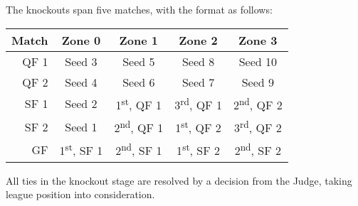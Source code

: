 The knockouts span five matches, with the format as follows:

\begin{center}
  \begin{tabular}{r|cccc}
  \toprule
  \textbf{Match} & \textbf{Zone 0} & \textbf{Zone 1} & \textbf{Zone 2} &
                   \textbf{Zone 3} \\
  \midrule
  QF 1 & Seed 3 & Seed 5 & Seed 8 & Seed 10 \\
  QF 2 & Seed 4 & Seed 6 & Seed 7 & Seed 9 \\
  SF 1 & Seed 2
       & 1\textsuperscript{st}, QF 1
       & 3\textsuperscript{rd}, QF 1
       & 2\textsuperscript{nd}, QF 2 \\
  SF 2 & Seed 1
       & 2\textsuperscript{nd}, QF 1
       & 1\textsuperscript{st}, QF 2
       & 3\textsuperscript{rd}, QF 2 \\
  GF & 1\textsuperscript{st}, SF 1
     & 2\textsuperscript{nd}, SF 1
     & 1\textsuperscript{st}, SF 2
     & 2\textsuperscript{nd}, SF 2 \\
  \bottomrule
  \end{tabular}
\end{center}

All ties in the knockout stage are resolved by a decision from the Judge, taking
league position into consideration.

